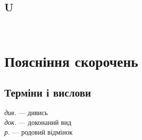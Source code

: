 \begin{twocolumn}
\section{U}
\\

\end{twocolumn}

\clearpage

\onecolumn
\section{Поясніння скорочень}
\subsection{Терміни і вислови}
\textit{див.} — дивись\\
\textit{док.} — доконаний вид\\
\textit{р.} — родовий відмінок

\thispagestyle{empty}


